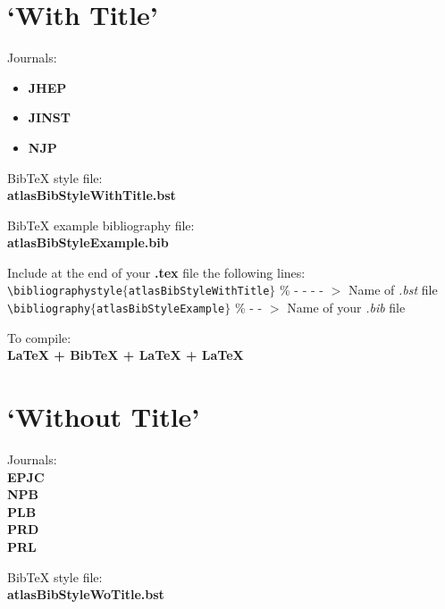 \documentclass{../../style/atlasdoc}
\begin{document}
\section{`With Title'}

Journals:
\begin{itemize}
\item \textbf{JHEP}
\item \textbf{JINST}
\item \textbf{NJP}
\end{itemize}

\bigskip
\noindent BibTeX style file: \\
\indent \textbf{atlasBibStyleWithTitle.bst}

\bigskip
\noindent BibTeX example bibliography file: \\
\indent \textbf{atlasBibStyleExample.bib}

\bigskip
\noindent Include at the end of your \textbf{.tex} file the following lines: \\
\indent \texttt{\textbackslash bibliographystyle$\{$atlasBibStyleWithTitle$\}$}  \% - - - - $>$ Name of \emph{.bst} file \\
\indent \texttt{\textbackslash bibliography$\{$atlasBibStyleExample$\}$}  \% - - $>$ Name of your \emph{.bib} file

\bigskip
\noindent To compile: \\
\indent \textbf{LaTeX + BibTeX + LaTeX + LaTeX} 


\section{`Without Title'}

Journals: \\
\indent \textbf{EPJC} \\
\indent \textbf{NPB} \\
\indent \textbf{PLB} \\
\indent \textbf{PRD} \\
\indent \textbf{PRL}

\bigskip
\noindent BibTeX style file: \\
\indent \textbf{atlasBibStyleWoTitle.bst}
\end{document}
